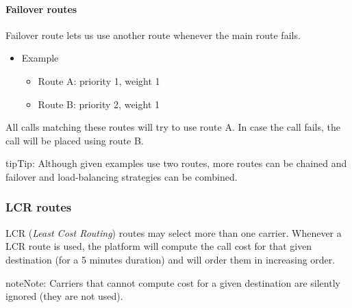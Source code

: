 \documentclass[letterpaper,10pt,english]{sphinxmanual}
\begin{document}
\paragraph{Failover routes}
\label{administration_portal/brand/routing/outgoing_routings:failover-routes}
Failover route lets us use another route whenever the main route fails.
\begin{itemize}
\item {} 
Example
\begin{itemize}
\item {} 
Route A: priority 1, weight 1

\item {} 
Route B: priority 2, weight 1

\end{itemize}

\end{itemize}

All calls matching these routes will try to use route A. In case the call fails,
the call will be placed using route B.

\begin{notice}{tip}{Tip:}
Although given examples use two routes, more routes can be chained and
failover and load-balancing strategies can be combined.
\end{notice}


\subsubsection{LCR routes}
\label{administration_portal/brand/routing/outgoing_routings:lcr-routes}
LCR (\emph{Least Cost Routing}) routes may select more than one carrier. Whenever a LCR route is used, the platform will compute the call cost for that
given destination (for a 5 minutes duration) and will order them in increasing order.

\begin{notice}{note}{Note:}
Carriers that cannot compute cost for a given destination are silently ignored (they are not used).
\end{notice}
\end{document}
